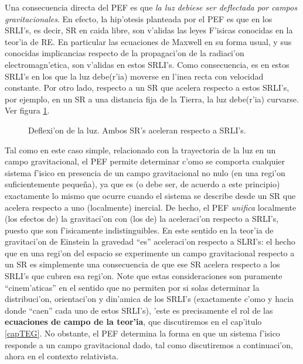Una consecuencia directa del PEF es que \textit{la luz debiese ser deflectada por campos gravitacionales}. En efecto, la hip'otesis planteada por el PEF es que en los SRLI's, es decir, SR en caida libre, son v'alidas las leyes F'isicas conocidas en la teor'ia de RE. En particular las ecuaciones de Maxwell en su forma usual, y sus conocidas implicancias respecto de la propagaci'on de la radiaci'on electromagn'etica, son v'alidas en estos SRLI's. Como consecuencia, es en estos SRLI's en los que la luz debe(r'ia) moverse en l'inea recta con velocidad constante. 
 Por otro lado, respecto a un SR que acelera respecto a estos SRLI's, por ejemplo, en un SR a una distancia fija de la Tierra, la luz debe(r'ia) curvarse. Ver figura \ref{fig:PEF-luz}.
\begin{figure}[H]
\centering{}
\caption{Deflexi'on de la luz. Ambos SR's aceleran respecto a SRLI's.}
\label{fig:PEF-luz}
\end{figure}
Tal como en este caso simple, relacionado con la trayectoria de la luz en un campo gravitacional, el PEF permite determinar c'omo se comporta cualquier sistema f'isico en presencia de un campo gravitacional no nulo (en una regi'on suficientemente peque\~na), ya que es (o debe ser, de acuerdo a este principio) exactamente lo mismo que ocurre cuando el sistema se describe desde un SR que acelera respecto a uno (localmente) inercial. De hecho, el PEF \textit{unifica} localmente (los efectos de) la gravitaci'on con (los de) la aceleraci'on respecto a SRLI's, puesto que son f'isicamente indistinguibles. En este sentido en la teor'ia de gravitaci'on de Einstein la gravedad ``es'' aceleraci'on respecto a SLRI's: el hecho que en una regi'on del espacio se experimente un campo gravitacional respecto a un SR es simplemente una consecuencia de que ese SR acelera respecto a los SRLI's que cubren esa regi'on. Note que estas consideraciones son puramente ``cinem'aticas'' en el sentido que no permiten por si solas determinar la distribuci'on, orientaci'on y din'amica de los SRLI's (exactamente c'omo y hacia donde ``caen'' cada uno de estos SRLI's), 'este es precisamente el rol de las \textbf{ecuaciones de campo de la teor'ia}, que discutiremos en el cap'itulo \ref{capTEG}. No obstante, el PEF determina la forma en que un sistema f'isico responde a un campo gravitacional dado, tal como discutiremos a continuaci'on, ahora en el contexto relativista.

